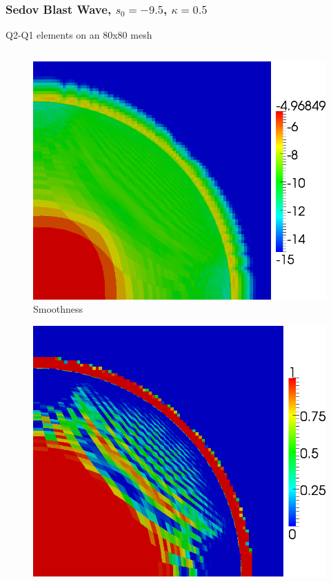 \documentclass[8pt,xcolor=svgnames]{beamer}
\begin{document}
\begin{frame}\frametitle{Sedov Blast Wave, $s_0=-9.5$, $\kappa=0.5$}
\vspace{1ex}
Q2-Q1 elements on an 80x80 mesh
\vspace{-4ex}
\begin{columns}
\begin{column}{0.3\textwidth}
\begin{figure}[t]
\begin{center}
\includegraphics[height=0.9\textwidth]{figs/Sedov/Q2l-80-smoothness.png}
\\Smoothness
\end{center}
\end{figure}
\begin{figure}[t]
\begin{center}
\includegraphics[height=0.9\textwidth]{figs/Sedov/Q2l-80-limiter.png}

\end{center}
\end{figure}
\end{column}
\end{columns}
\end{frame}
\end{document}
